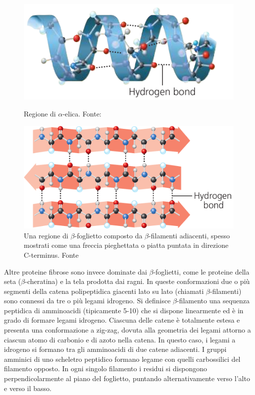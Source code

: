 \begin{figure}[!htb]
	\includegraphics[scale=0.34]{images/eliche.png}
	\caption{Regione di $\alpha$-elica. Fonte: \cite{campbell}}
	\label{fig:eliche}
	\endminipage\hfill
	\centering
	\includegraphics[scale=0.31]{images/foglietti.png}
	\caption{Una regione di $\beta$-foglietto composto da $\beta$-filamenti adiacenti, spesso mostrati come una freccia pieghettata o piatta puntata in direzione C-terminus. Fonte \cite{campbell}}
	\label{fig:foglietti}
	\endminipage\hfill
\end{figure}

Altre proteine fibrose sono invece dominate dai $\beta$-foglietti, come le proteine della seta ($\beta$-cheratina) e la tela prodotta dai ragni. In queste conformazioni due o più segmenti della catena polipeptidica giacenti lato su lato (chiamati $\beta$-filamenti) sono connessi da tre o più legami idrogeno. Si definisce $\beta$-filamento una sequenza peptidica di amminoacidi (tipicamente 5-10) che si dispone linearmente ed è in grado di formare legami idrogeno. Ciascuna delle catene è totalmente estesa e presenta una conformazione a zig-zag, dovuta alla geometria dei legami attorno a ciascun atomo di carbonio e di azoto nella catena. In questo caso, i legami a idrogeno si formano tra gli amminoacidi di due catene adiacenti. I gruppi amminici di uno scheletro peptidico formano legame con quelli carbossilici del filamento opposto. In ogni singolo filamento i residui si dispongono perpendicolarmente al piano del foglietto, puntando alternativamente verso l'alto e verso il basso.

